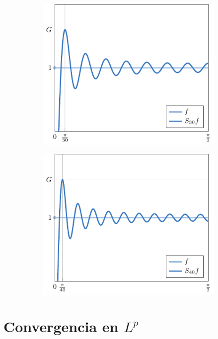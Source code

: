 \documentclass{beamer}
\begin{document}
\begin{frame}
\begin{figure}[H]
\begin{subfigure}[b]{0.49\textwidth}
        \includegraphics[scale = 0.58]{images/12.pdf}
    \end{subfigure}
    \begin{subfigure}[b]{0.49\textwidth}
        \centering
        \includegraphics[scale = 0.58]{images/13.pdf}
    \end{subfigure}
    \end{figure}
\end{frame}


\section{Convergencia en \texorpdfstring{$L^p$}{Lp}}
\end{document}
